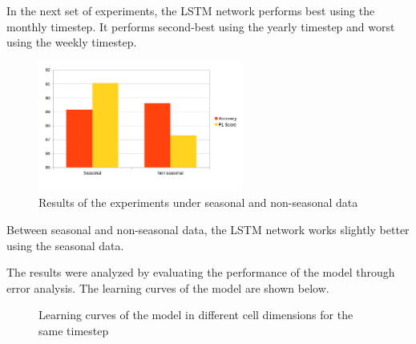 \documentclass[a0]{sciposter}
\begin{document}
\begin{multicols}{2}
    In the next set of experiments, the LSTM network performs best using the monthly timestep. It performs second-best using the yearly timestep and worst using the weekly timestep.

    \begin{figure}[ht]
    \centering
    \includegraphics[width=0.6\textwidth]{seasonal-experiments}
    \caption{Results of  the experiments under seasonal and non-seasonal data}
    \end{figure}

    Between seasonal and non-seasonal data, the LSTM network works slightly better using the seasonal data.

    The results were analyzed by evaluating the performance of the model through error analysis. The learning curves of the model are shown below.

    \begin{figure}
    \label{fig:dimension-learning-curve}
    \centering     %
    \caption{Learning curves of the model in different cell dimensions for the same timestep}
    \end{figure}


\end{multicols}
\end{document}
